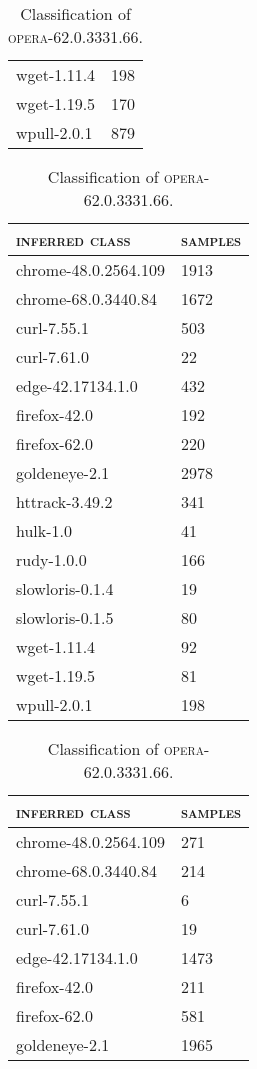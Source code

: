 \begin{table}[H]
\begin{subtable}{.45\linewidth}
\begin{tabular}{ll}
		wget-1.11.4 & 198\\
		wget-1.19.5 & 170\\
		wpull-2.0.1 & 879\\
		\bottomrule
	\end{tabular}
	\caption{Classification of \textsc{grabsite-2.1.16}.}
	\end{subtable}
	\begin{subtable}{.45\linewidth}
		\centering
	\begin{tabular}{ll}
		\toprule
		\textsc{inferred class} & \textsc{samples}\\
		\midrule
		chrome-48.0.2564.109 & 1913\\
		chrome-68.0.3440.84 & 1672\\
		curl-7.55.1 & 503\\
		curl-7.61.0 & 22\\
		edge-42.17134.1.0 & 432\\
		firefox-42.0 & 192\\
		firefox-62.0 & 220\\
		goldeneye-2.1 & 2978\\
		httrack-3.49.2 & 341\\
		hulk-1.0 & 41\\
		rudy-1.0.0 & 166\\
		slowloris-0.1.4 & 19\\
		slowloris-0.1.5 & 80\\
		wget-1.11.4 & 92\\
		wget-1.19.5 & 81\\
		wpull-2.0.1 & 198\\
		\bottomrule
	\end{tabular}
	\caption{Classification of \textsc{opera-62.0.3331.66}.}
	\end{subtable}
	\begin{subtable}{.45\linewidth}
		\centering
	\begin{tabular}{ll}
		\toprule
		\textsc{inferred class} & \textsc{samples}\\
		\midrule
		chrome-48.0.2564.109 & 271\\
		chrome-68.0.3440.84 & 214\\
		curl-7.55.1 & 6\\
		curl-7.61.0 & 19\\
		edge-42.17134.1.0 & 1473\\
		firefox-42.0 & 211\\
		firefox-62.0 & 581\\
		goldeneye-2.1 & 1965\\

\end{tabular}
\end{subtable}
\end{table}
